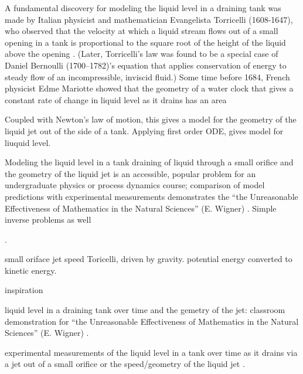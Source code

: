 \documentclass[openacc]{rsproca_new}%
\begin{document}
A fundamental discovery for modeling the liquid level in a draining tank was made by Italian physicist and mathematician Evangelista Torricelli (1608-1647), who observed that the velocity at which a liquid stream flows out of a small opening in a tank is proportional to the square root of the height of the liquid above the opening \cite{mills1982newton}. (Later, Torricelli's law was found to be a special case of Daniel Bernoulli (1700–1782)'s equation that applies conservation of energy to steady flow of an incompressible, inviscid fluid.) Some time before 1684, French physicist Edme Mariotte showed that the geometry of a water clock that gives a constant rate of change in liquid level as it drains has an area  

Coupled with Newton's law of motion, this gives a model for the geometry of the liquid jet out of the side of a tank. 
Applying first order ODE, gives model for liuquid level. 

Modeling the liquid level in a tank draining of liquid through a small orifice and the geometry of the liquid jet is an accessible, popular problem for an undergraduate physics or process dynamics course; comparison of model predictions with experimental measurements demonstrates the ``the Unreasonable Effectiveness of Mathematics in the Natural Sciences'' (E. Wigner\cite{wigner1990unreasonable}) 
\cite{farmer1992physical,driver1998torricelli,brady2009siphons,rother2024modelling,paldy1963apparatus,ivanov2014testing,williams2021vessel}. Simple inverse problems as well \cite{groetsch1993inverse,groetsch1999inverse}




\cite{oshikawa2019simple,d2021torricelli}.

small oriface jet speed Toricelli, driven by gravity. potential energy converted to kinetic energy.

inspiration \cite{groetsch1993inverse,groetsch1999inverse}




liquid level in a draining tank over time and the gemetry of the jet:
classroom demonstration for ``the Unreasonable Effectiveness of
Mathematics in the Natural Sciences'' (E. Wigner\cite{wigner1990unreasonable}) \cite{farmer1992physical,driver1998torricelli,brady2009siphons,rother2024modelling,paldy1963apparatus,ivanov2014testing,williams2021vessel}.

experimental measurements of the liquid level in a tank over time as it drains via a jet out of a small orifice \cite{de2000pin,blasone2015discharge,wadhwa2021study,liu2008drainage} or the speed/geometry of the liquid jet \cite{pavesi2019investigating,planinvsivc2011holes,saleta2005experimental,lopac2015water}.
\end{document}
